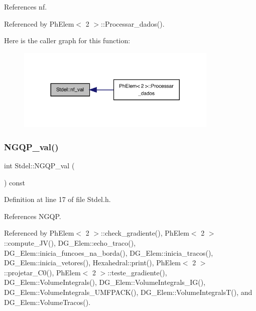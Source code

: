 References nf.



Referenced by Ph\+Elem$<$ 2 $>$\+::\+Processar\+\_\+dados().

Here is the caller graph for this function\+:
\nopagebreak
\begin{figure}[H]
\begin{center}
\leavevmode
\includegraphics[width=272pt]{classStdel_a2eed3ce0b73050e868989be78d918e5c_icgraph}
\end{center}
\end{figure}
\mbox{\label{classStdel_a2f964819235e0a55fd60733518b592f2}} 
\subsubsection{\texorpdfstring{N\+G\+Q\+P\+\_\+val()}{NGQP\_val()}}
{\footnotesize\ttfamily int Stdel\+::\+N\+G\+Q\+P\+\_\+val (\begin{DoxyParamCaption}{ }\end{DoxyParamCaption}) const\hspace{0.3cm}{\ttfamily [inline]}}



Definition at line 17 of file Stdel.\+h.



References N\+G\+QP.



Referenced by Ph\+Elem$<$ 2 $>$\+::check\+\_\+gradiente(), Ph\+Elem$<$ 2 $>$\+::compute\+\_\+\+J\+V(), D\+G\+\_\+\+Elem\+::echo\+\_\+traco(), D\+G\+\_\+\+Elem\+::inicia\+\_\+funcoes\+\_\+na\+\_\+borda(), D\+G\+\_\+\+Elem\+::inicia\+\_\+tracos(), D\+G\+\_\+\+Elem\+::inicia\+\_\+vetores(), Hexahedral\+::print(), Ph\+Elem$<$ 2 $>$\+::projetar\+\_\+\+C0(), Ph\+Elem$<$ 2 $>$\+::teste\+\_\+gradiente(), D\+G\+\_\+\+Elem\+::\+Volume\+Integrals(), D\+G\+\_\+\+Elem\+::\+Volume\+Integrals\+\_\+\+I\+G(), D\+G\+\_\+\+Elem\+::\+Volume\+Integrals\+\_\+\+U\+M\+F\+P\+A\+C\+K(), D\+G\+\_\+\+Elem\+::\+Volume\+Integrals\+T(), and D\+G\+\_\+\+Elem\+::\+Volume\+Tracos().

